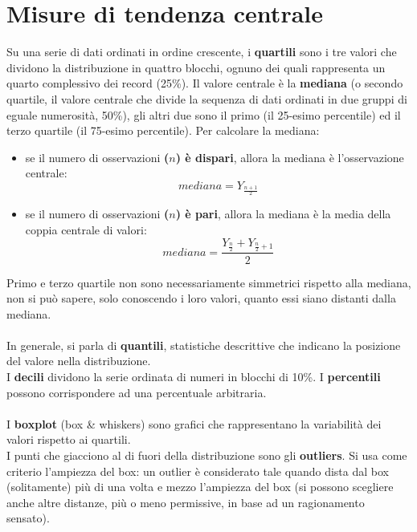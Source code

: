 \documentclass[10pt, draft]{book}
\newcommand{\tightlist}{%
\setlength{\itemsep}{1pt}\setlength{\parskip}{0pt}\setlength{\parsep}{0pt}}
\begin{document}
\section{Misure di tendenza centrale}
Su una serie di dati ordinati in ordine crescente, i \textbf{quartili} sono i tre valori che dividono la distribuzione in quattro blocchi, ognuno dei quali rappresenta un quarto complessivo dei record (25\%). Il valore centrale è la \textbf{mediana} (o secondo quartile, il valore centrale che divide la sequenza di dati ordinati in due gruppi di eguale numerosità, 50\%), gli altri due sono il primo (il 25-esimo percentile) ed il terzo quartile (il 75-esimo percentile).
Per calcolare la mediana:
\begin{itemize} \tightlist
    \item se il numero di osservazioni \textbf{($n$) è dispari}, allora la mediana è l'osservazione centrale:
    \begin{equation}
        mediana = Y_{\frac{n+1}{2}}
    \end{equation}
    \item se il numero di osservazioni \textbf{($n$) è pari}, allora la mediana è la media della coppia centrale di valori:
    \begin{equation}
        mediana = \frac{Y_{\frac{n}{2}} + Y_{\frac{n}{2}+1}}{2}
    \end{equation}
\end{itemize}
Primo e terzo quartile non sono necessariamente simmetrici rispetto alla mediana, non si può sapere, solo conoscendo i loro valori, quanto essi siano distanti dalla mediana.
\\
\\
In generale, si parla di \textbf{quantili}, statistiche descrittive che indicano la posizione del valore nella distribuzione.
\\
I \textbf{decili} dividono la serie ordinata di numeri in blocchi di 10\%.
I \textbf{percentili} possono corrispondere ad una percentuale arbitraria.
\\
\\
I \textbf{boxplot} (box \& whiskers) sono grafici che rappresentano la variabilità dei valori rispetto ai quartili.
\\
I punti che giacciono al di fuori della distribuzione sono gli \textbf{outliers}. Si usa come criterio l'ampiezza del box: un outlier è considerato tale quando dista dal box (solitamente) più di una volta e mezzo l'ampiezza del box (si possono scegliere anche altre distanze, più o meno permissive, in base ad un ragionamento sensato).
\end{document}
